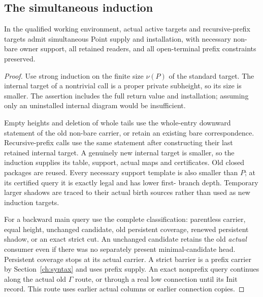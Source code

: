 

\subsection{The simultaneous induction}
\begin{theorem}\label{thm:point}
In the qualified working environment, actual active targets and
recursive-prefix targets admit simultaneous Point supply and
installation, with necessary non-bare owner support, all retained
readers, and all open-terminal prefix constraints preserved.
\end{theorem}
\begin{proof}
Use strong induction on the finite size $\nu(P)$ of the standard
target. The internal target of a nontrivial call is a proper
private subheight, so its size is smaller. The assertion includes
the full return value and installation; assuming only an uninstalled
internal diagram would be insufficient.

Empty heights and deletion of whole tails use the whole-entry
downward statement of the old non-bare carrier, or retain an existing
bare correspondence. Recursive-prefix calls use the same statement
after constructing their last retained internal target. A genuinely
new internal target is smaller, so the induction supplies its table,
support, actual maps and certificates. Old closed packages are
reused. Every necessary support template is also smaller than $P$;
at its certified query it is exactly legal and has lower first-
branch depth. Temporary larger shadows are traced to their actual
birth sources rather than used as new induction targets.

For a backward main query use the complete classification: parentless
carrier, equal height, unchanged candidate, old persistent coverage,
renewed persistent shadow, or an exact strict cut. An unchanged
candidate retains the old \emph{actual} consumer even if there was
no separately present minimal-candidate head. Persistent coverage
stops at its actual carrier. A strict barrier is a prefix carrier by
Section~\ref{ch:syntax} and uses prefix supply. An exact nonprefix
query continues along the actual old $\Gamma$ route, or through a
real low connection until its Init record. This route uses earlier
actual columns or earlier connection copies.


\end{proof}
